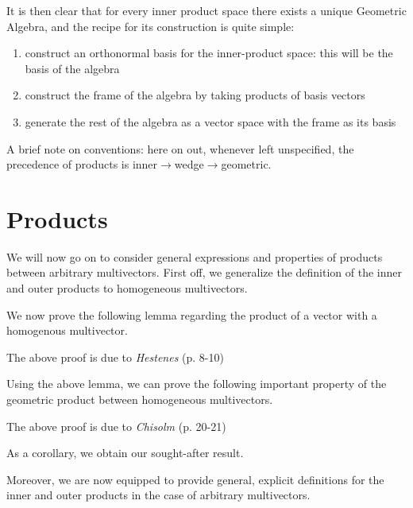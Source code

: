It is then clear that for every inner product space there exists a unique Geometric Algebra, and the recipe for its construction is quite simple:
\begin{enumerate}
	\item construct an orthonormal basis for the inner-product space: this will be the basis of the algebra
	\item construct the frame of the algebra by taking products of basis vectors
	\item generate the rest of the algebra as a vector space with the frame as its basis
\end{enumerate}

% 
% 

A brief note on conventions: here on out, whenever left unspecified, the precedence of products is inner$\to$wedge$\to$geometric.

%
%



\section{Products}\label{s:products}
We will now go on to consider general expressions and properties of products between arbitrary multivectors.
First off, we generalize the definition of the inner and outer products to homogeneous multivectors.



We now prove the following lemma regarding the product of a vector with a homogenous multivector.



The above proof is due to \textit{Hestenes} (p. 8-10)\cite{ga-origin}

Using the above lemma, we can prove the following important property of the geometric product between homogeneous multivectors.



The above proof is due to \textit{Chisolm} (p. 20-21)\cite{ga-chisolm}

As a corollary, we obtain our sought-after result.



Moreover, we are now equipped to provide general, explicit definitions for the inner and outer products in the case of arbitrary multivectors.



